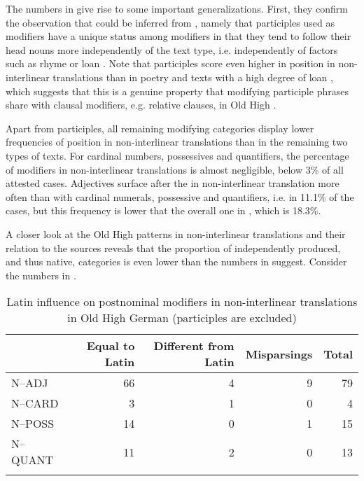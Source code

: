 \documentclass[output=paper,colorlinks,citecolor=brown,draft]{langscibook}
\begin{document}
The numbers in  give rise to some important generalizations. First, they confirm the observation that could be inferred from , namely that participles used as modifiers have a unique status among modifiers in that they tend to follow their head nouns more independently of the text type, i.e. independently of factors such as rhyme or loan . Note that participles score even higher in  position in non-interlinear translations than in poetry and texts with a high degree of loan , which suggests that this is a genuine property that modifying participle phrases share with clausal modifiers, e.g.  relative clauses, in Old High . 

Apart from participles, all remaining modifying categories display lower frequencies of  position in non-interlinear translations than in the remaining two types of texts. For cardinal numbers, possessives and quantifiers, the percentage of  modifiers in non-interlinear translations is almost negligible, below 3\% of all attested cases. Adjectives surface after the  in non-interlinear translation more often than with cardinal numerals, possessive and quantifiers, i.e. in 11.1\% of the cases, but this frequency is lower that the overall one in , which is 18.3\%. 

A closer look at the Old High  patterns in non-interlinear translations and their relation to the  sources reveals that the proportion of independently produced, and thus native,  categories is even lower than the numbers in  suggest. Consider the numbers in .

\begin{table}
\caption{Latin influence on postnominal modifiers in non-interlinear translations in Old High German (participles are excluded)}
\label{tabOHGILL}
 \begin{tabular}{l@{}rrrr}
  \lsptoprule
  & Equal to Latin  & Different from Latin & {Misparsings} & {Total} \\
  \midrule
  N--ADJ & 66 & 4 & 9 & 79\\
  N--CARD & 3 & 1 & 0 & 4\\
  N--POSS & 14 & 0 & 1 & 15\\
  N--QUANT & 11 & 2 & 0 & 13\\
  \lspbottomrule
 \end{tabular}
\end{table}
\end{document}
